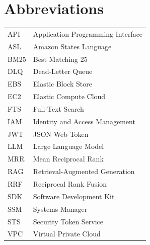 \documentclass[11pt,a4paper,oneside]{report}
\renewcommand{\arraystretch}{1.18}
\begin{document}
\chapter*{Abbreviations}
\begin{tabularx}{\linewidth}{lY}\toprule API&Application Programming Interface\\ASL&Amazon States Language\\BM25&Best Matching 25\\DLQ&Dead-Letter Queue\\EBS&Elastic Block Store\\EC2&Elastic Compute Cloud\\FTS&Full-Text Search\\IAM&Identity and Access Management\\JWT&JSON Web Token\\LLM&Large Language Model\\MRR&Mean Reciprocal Rank\\RAG&Retrieval-Augmented Generation\\RRF&Reciprocal Rank Fusion\\SDK&Software Development Kit\\SSM&Systems Manager\\STS&Security Token Service\\VPC&Virtual Private Cloud\\\bottomrule\end{tabularx}
\clearpage{}




















\appendix\small{}\renewcommand{\arraystretch}{1.06}\setlength{\LTpre}{4pt}\setlength{\LTpost}{6pt}
\end{document}
